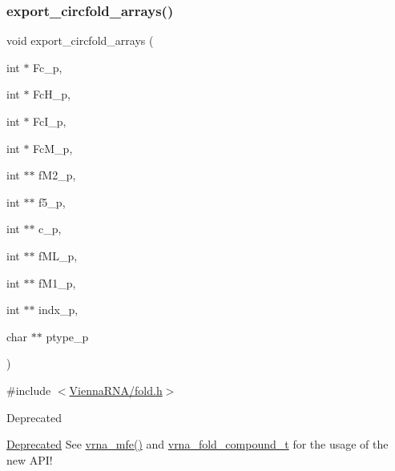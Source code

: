 \subsubsection{\texorpdfstring{export\_circfold\_arrays()}{export\_circfold\_arrays()}}
{\footnotesize\ttfamily void export\+\_\+circfold\+\_\+arrays (\begin{DoxyParamCaption}\item[{int $\ast$}]{Fc\+\_\+p,  }\item[{int $\ast$}]{Fc\+H\+\_\+p,  }\item[{int $\ast$}]{Fc\+I\+\_\+p,  }\item[{int $\ast$}]{Fc\+M\+\_\+p,  }\item[{int $\ast$$\ast$}]{f\+M2\+\_\+p,  }\item[{int $\ast$$\ast$}]{f5\+\_\+p,  }\item[{int $\ast$$\ast$}]{c\+\_\+p,  }\item[{int $\ast$$\ast$}]{f\+M\+L\+\_\+p,  }\item[{int $\ast$$\ast$}]{f\+M1\+\_\+p,  }\item[{int $\ast$$\ast$}]{indx\+\_\+p,  }\item[{char $\ast$$\ast$}]{ptype\+\_\+p }\end{DoxyParamCaption})}



{\ttfamily \#include $<$\mbox{\hyperlink{fold_8h}{Vienna\+R\+N\+A/fold.\+h}}$>$}

\begin{DoxyRefDesc}{Deprecated}
\item[\mbox{\hyperlink{deprecated__deprecated000074}{Deprecated}}]See \mbox{\hyperlink{group__mfe__global_gabd3b147371ccf25c577f88bbbaf159fd}{vrna\+\_\+mfe()}} and \mbox{\hyperlink{group__fold__compound_ga1b0cef17fd40466cef5968eaeeff6166}{vrna\+\_\+fold\+\_\+compound\+\_\+t}} for the usage of the new A\+P\+I!\end{DoxyRefDesc}
\mbox{\label{group__mfe__global__deprecated_ga004bb901e7fd2f8d5ae68f9530318ce1}} 
